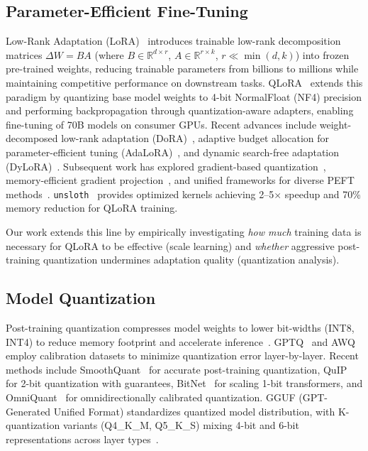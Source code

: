 \documentclass[twocolumn]{article}
\begin{document}
\subsection{Parameter-Efficient Fine-Tuning}

Low-Rank Adaptation (LoRA)~\cite{hu2022lora} introduces trainable low-rank decomposition
matrices $\Delta W = BA$ (where $B \in \mathbb{R}^{d \times r}$, $A \in \mathbb{R}^{r \times k}$,
$r \ll \min(d,k)$) into frozen pre-trained weights, reducing trainable parameters from
billions to millions while maintaining competitive performance on downstream tasks.
QLoRA~\cite{dettmers2023qlora} extends this paradigm by quantizing base model weights to
4-bit NormalFloat (NF4) precision and performing backpropagation through quantization-aware
adapters, enabling fine-tuning of 70B models on consumer GPUs.
Recent advances include weight-decomposed low-rank adaptation (DoRA)~\cite{liu2024dora},
adaptive budget allocation for parameter-efficient tuning (AdaLoRA)~\cite{zhang2023adalora},
and dynamic search-free adaptation (DyLoRA)~\cite{valipour2023dylora}.
Subsequent work has explored gradient-based quantization~\cite{xu2023qalora}, memory-efficient
gradient projection~\cite{zhao2024galore}, and unified frameworks for diverse
PEFT methods~\cite{zheng2024llamafactory}.
\texttt{unsloth}~\cite{han2023unsloth} provides optimized kernels achieving 2--5$\times$
speedup and 70\% memory reduction for QLoRA training.

Our work extends this line by empirically investigating \emph{how much} training data is
necessary for QLoRA to be effective (scale learning) and \emph{whether} aggressive
post-training quantization undermines adaptation quality (quantization analysis).

\subsection{Model Quantization}

Post-training quantization compresses model weights to lower bit-widths (INT8, INT4) to
reduce memory footprint and accelerate inference~\cite{dettmers2022llmint8}.
GPTQ~\cite{frantar2023gptq} and AWQ~\cite{lin2024awq} employ calibration datasets to
minimize quantization error layer-by-layer.
Recent methods include SmoothQuant~\cite{xiao2023smoothquant} for accurate post-training
quantization, QuIP~\cite{tseng2024quip} for 2-bit quantization with guarantees,
BitNet~\cite{wang2023bitnet} for scaling 1-bit transformers, and
OmniQuant~\cite{ma2024omniquant} for omnidirectionally calibrated quantization.
GGUF (GPT-Generated Unified Format) standardizes quantized model distribution, with
K-quantization variants (Q4\_K\_M, Q5\_K\_S) mixing 4-bit and 6-bit representations
across layer types~\cite{gerganov2023ggml}.
\end{document}
